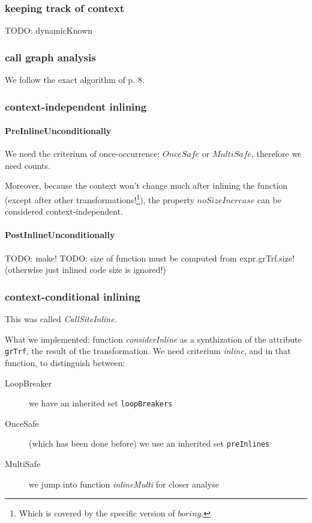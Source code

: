 \documentclass{article}
\begin{document}
\subsubsection{keeping track of context}
TODO: dynamicKnown

\subsubsection{call graph analysis}
We follow the exact algorithm of p. 8.

\subsubsection{context-independent inlining}
\paragraph{PreInlineUnconditionally}

We need the criterium of once-occurrence: $OnceSafe$ or $MultiSafe$, therefore we need counts.

Moreover, because the \grin context won't change much after inlining the function (except after other transformations!\footnote{Which is covered by the \grin specific version of $boring$.}), the property $noSizeIncrease$ can be considered context-independent.

\paragraph{PostInlineUnconditionally}
TODO: make!
TODO: size of function must be computed from expr.grTrf.size! (otherwise just inlined code size is ignored!)

\subsubsection{context-conditional inlining}
This was called \emph{CallSiteInline}.

What we implemented: function \emph{considerInline} as a synthization of the attribute \texttt{grTrf}, the result of the transformation. We need criterium \emph{inline}, and in that function, to distinguish between:
\begin{description}
\item[LoopBreaker] we have an inherited set \texttt{loopBreakers}
\item[OnceSafe] (which has been done before) we use an inherited set \texttt{preInlines}
\item[MultiSafe] we jump into function \emph{inlineMulti} for closer analyse 
\end{description}
\end{document}
